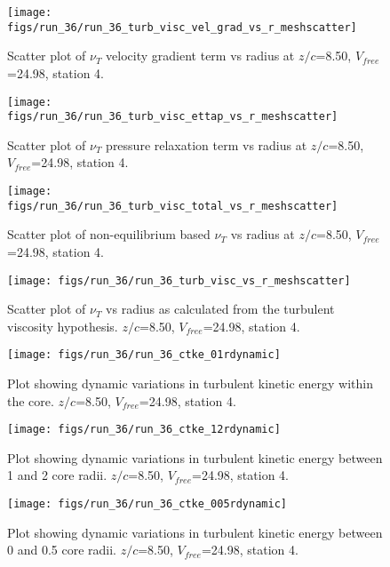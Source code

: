 \begin{figure}[H]
\centering
\texttt{[image: figs/run\_36/run\_36\_turb\_visc\_vel\_grad\_vs\_r\_meshscatter]}
\caption{Scatter plot of $\nu_T$ velocity gradient term vs radius at $z/c$=8.50, $V_{free}$=24.98, station 4.}
\end{figure}


\begin{figure}[H]
\centering
\texttt{[image: figs/run\_36/run\_36\_turb\_visc\_ettap\_vs\_r\_meshscatter]}
\caption{Scatter plot of $\nu_T$ pressure relaxation term vs radius at $z/c$=8.50, $V_{free}$=24.98, station 4.}
\end{figure}


\begin{figure}[H]
\centering
\texttt{[image: figs/run\_36/run\_36\_turb\_visc\_total\_vs\_r\_meshscatter]}
\caption{Scatter plot of non-equilibrium based $\nu_T$ vs radius at $z/c$=8.50, $V_{free}$=24.98, station 4.}
\end{figure}


\begin{figure}[H]
\centering
\texttt{[image: figs/run\_36/run\_36\_turb\_visc\_vs\_r\_meshscatter]}
\caption{Scatter plot of $\nu_T$ vs radius as calculated from the turbulent viscosity hypothesis. $z/c$=8.50, $V_{free}$=24.98, station 4.}
\end{figure}


\begin{figure}[H]
\centering
\texttt{[image: figs/run\_36/run\_36\_ctke\_01rdynamic]}
\caption{Plot showing dynamic variations in turbulent kinetic energy within the core. $z/c$=8.50, $V_{free}$=24.98, station 4.}
\end{figure}


\begin{figure}[H]
\centering
\texttt{[image: figs/run\_36/run\_36\_ctke\_12rdynamic]}
\caption{Plot showing dynamic variations in turbulent kinetic energy between 1 and 2 core radii. $z/c$=8.50, $V_{free}$=24.98, station 4.}
\end{figure}


\begin{figure}[H]
\centering
\texttt{[image: figs/run\_36/run\_36\_ctke\_005rdynamic]}
\caption{Plot showing dynamic variations in turbulent kinetic energy between 0 and 0.5 core radii. $z/c$=8.50, $V_{free}$=24.98, station 4.}
\end{figure}


